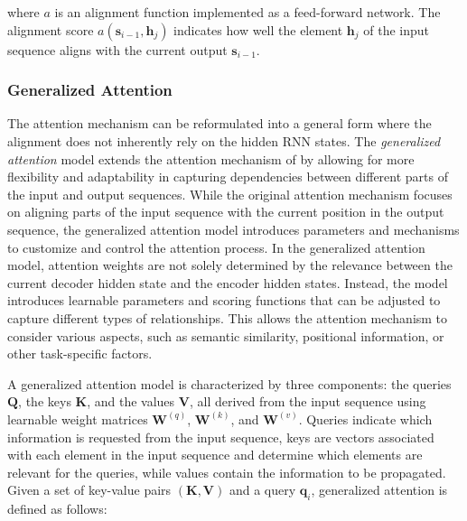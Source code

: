 
\noindent where $a$ is an alignment function implemented as a feed-forward network. The alignment score $a(\bm{s}_{i-1}, \bm{h}_j)$ indicates how well the element $\bm{h}_j$ of the input sequence aligns with the current output $\bm{s}_{i-1}$. 

\subsubsection{Generalized Attention} 

The attention mechanism can be reformulated into a general form where the alignment does not inherently rely on the hidden \ac{RNN} states. The \textit{generalized attention} model \citep{chaudhari2021attentive} extends the attention mechanism of \citet{bahdanau2014neural} by allowing for more flexibility and adaptability in capturing dependencies between different parts of the input and output sequences. While the original attention mechanism focuses on aligning parts of the input sequence with the current position in the output sequence, the generalized attention model introduces parameters and mechanisms to customize and control the attention process. In the generalized attention model, attention weights are not solely determined by the relevance between the current decoder hidden state and the encoder hidden states. Instead, the model introduces learnable parameters and scoring functions that can be adjusted to capture different types of relationships. This allows the attention mechanism to consider various aspects, such as semantic similarity, positional information, or other task-specific factors.

A generalized attention model is characterized by three components: the queries $\bm{Q}$, the keys $\bm{K}$, and the values $\bm{V}$, all derived from the input sequence using learnable weight matrices $\bm{W}^{(q)}$, $\bm{W}^{(k)}$, and $\bm{W}^{(v)}$. Queries indicate which information is requested from the input sequence, keys are vectors associated with each element in the input sequence and determine which elements are relevant for the queries, while values contain the information to be propagated. Given a set of key-value pairs $(\bm{K}, \bm{V})$ and a query $\bm{q}_i$, generalized attention is defined as follows:

